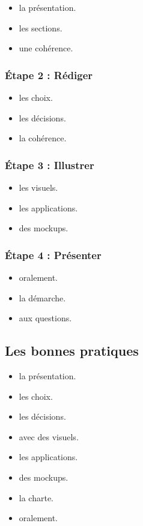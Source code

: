 \begin{itemize}
    \item {} la présentation.
    \item {} les sections.
    \item {} une cohérence.
\end{itemize}

\subsubsection{Étape 2 : Rédiger}

\begin{itemize}
    \item {} les choix.
    \item {} les décisions.
    \item {} la cohérence.
\end{itemize}

\subsubsection{Étape 3 : Illustrer}

\begin{itemize}
    \item {} les visuels.
    \item {} les applications.
    \item {} des mockups.
\end{itemize}

\subsubsection{Étape 4 : Présenter}

\begin{itemize}
    \item {} oralement.
    \item {} la démarche.
    \item {} aux questions.
\end{itemize}

\subsection{Les bonnes pratiques}

\begin{itemize}
    \item {} la présentation.
    \item {} les choix.
    \item {} les décisions.
    \item {} avec des visuels.
    \item {} les applications.
    \item {} des mockups.
    \item {} la charte.
    \item {} oralement.
\end{itemize}

